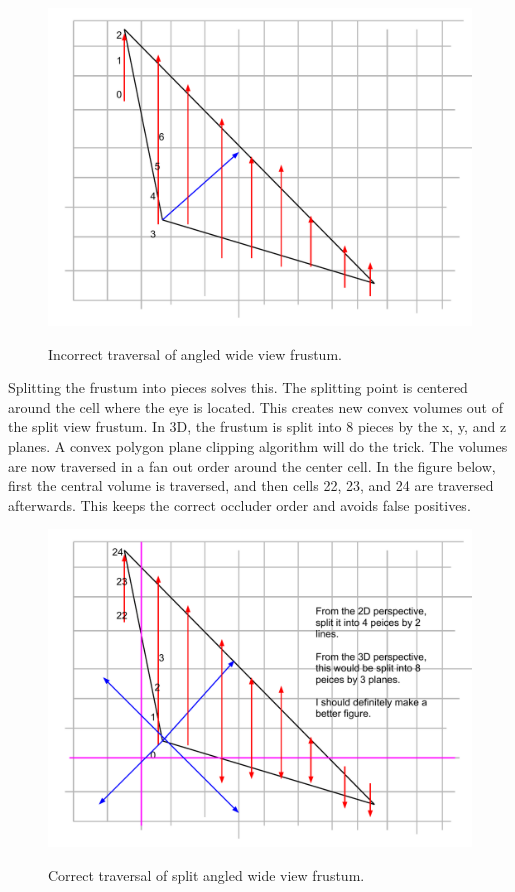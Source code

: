 \documentclass[12pt]{ucthesis}
\newcommand{\captionfonts}{\small\bf\ssp}
\begin{document}
\begin{figure}
\begin{center}
\includegraphics[width=\textwidth]{Images/wide-frustum.pdf}
\captionfonts
\caption[Incorrect Wide View Frustum Traversal]{Incorrect traversal of angled wide view frustum.}
\label{fig:wide-frustum-iter}
\end{center}
\end{figure}

Splitting the frustum into pieces solves this.
The splitting point is centered around the cell where the eye is located.
This creates new convex volumes out of the split view frustum.
In 3D, the frustum is split into 8 pieces by the x, y, and z planes.
A convex polygon plane clipping algorithm will do the trick.
The volumes are now traversed in a fan out order around the center cell.
In the figure below, first the central volume is traversed, and then cells 22, 23, and 24 are traversed afterwards.
This keeps the correct occluder order and avoids false positives.

\begin{figure}
\begin{center}
\includegraphics[width=\textwidth]{Images/wide-traversal.pdf}
\captionfonts
\caption[Corret Wide View Frustum]{Correct traversal of split angled wide view frustum.}
\label{fig:correct-wide-frustum-iter}
\end{center}
\end{figure}
\end{document}
